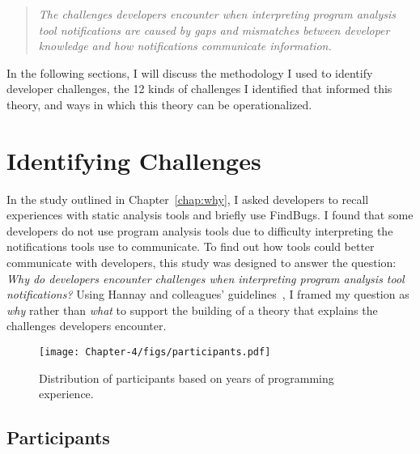\begin{quotation}
	\noindent
	\emph{The challenges developers encounter when interpreting program analysis tool notifications are caused by gaps and mismatches between developer knowledge and how notifications communicate information.}
\end{quotation}

In the following sections, I will discuss the methodology I used to identify developer challenges, the 12 kinds of challenges I identified that informed this theory, and ways in which this theory can be operationalized.	

\section{Identifying Challenges}



In the study outlined in Chapter~\ref{chap:why}, I asked developers to recall experiences with static analysis tools and briefly use FindBugs. I found that some developers do not use program analysis tools due to difficulty interpreting the notifications tools use to communicate. 
To find out how tools could better communicate with developers, this study was designed to answer the
question: \noindent\emph{Why do developers encounter challenges when interpreting program analysis tool notifications?} Using Hannay and colleagues' guidelines~\cite{hannay2007systematic}, 
I framed my question as \emph{why} rather than \emph{what} to support the building of a theory that explains the challenges developers encounter.

\begin{figure*} [ht]
\centering
\texttt{[image: Chapter-4/figs/participants.pdf]}
\caption{Distribution of participants based on years of programming
experience.}
\label{fig:participants}
\end{figure*}

\subsection{Participants} \label{participants}

